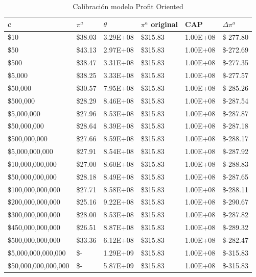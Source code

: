 \begin{table}[H]
    \centering
    \begin{tabular}{|l|l|l|l|l|l|}
    \hline
        c & $\pi^a$ & $\theta$ & $\pi^a$ original &  CAP& $\Delta \pi^a$  \\ \hline
         \$10  &  \$38.03  & 3.29E+08 &  \$315.83  & 1.00E+08 &  \$-277.80   \\ \hline
         \$50  &  \$43.13  & 2.97E+08 &  \$315.83  & 1.00E+08 &  \$-272.69   \\ \hline
         \$500  &  \$38.47  & 3.31E+08 &  \$315.83  & 1.00E+08 &  \$-277.35   \\ \hline
         \$5,000  &  \$38.25  & 3.33E+08 &  \$315.83  & 1.00E+08 &  \$-277.57   \\ \hline
         \$50,000  &  \$30.57  & 7.95E+08 &  \$315.83  & 1.00E+08 &  \$-285.26   \\ \hline
         \$500,000  &  \$28.29  & 8.46E+08 &  \$315.83  & 1.00E+08 &  \$-287.54   \\ \hline
         \$5,000,000  &  \$27.96  & 8.53E+08 &  \$315.83  & 1.00E+08 &  \$-287.87   \\ \hline
         \$50,000,000  &  \$28.64  & 8.39E+08 &  \$315.83  & 1.00E+08 &  \$-287.18   \\ \hline
         \$500,000,000  &  \$27.66  & 8.59E+08 &  \$315.83  & 1.00E+08 &  \$-288.17   \\ \hline
         \$5,000,000,000  &  \$27.91  & 8.54E+08 &  \$315.83  & 1.00E+08 &  \$-287.92   \\ \hline
         \$10,000,000,000  &  \$27.00  & 8.60E+08 &  \$315.83  & 1.00E+08 &  \$-288.83   \\ \hline
         \$50,000,000,000  &  \$28.18  & 8.49E+08 &  \$315.83  & 1.00E+08 &  \$-287.65   \\ \hline
         \$100,000,000,000  &  \$27.71  & 8.58E+08 &  \$315.83  & 1.00E+08 &  \$-288.11   \\ \hline
         \$200,000,000,000  &  \$25.16  & 9.22E+08 &  \$315.83  & 1.00E+08 &  \$-290.67   \\ \hline
         \$300,000,000,000  &  \$28.00  & 8.53E+08 &  \$315.83  & 1.00E+08 &  \$-287.82   \\ \hline
         \$450,000,000,000  &  \$26.51  & 8.87E+08 &  \$315.83  & 1.00E+08 &  \$-289.32   \\ \hline
         \$500,000,000,000  &  \$33.36  & 6.12E+08 &  \$315.83  & 1.00E+08 &  \$-282.47   \\ \hline
         \$5,000,000,000,000  &  \$-  & 1.29E+09 &  \$315.83  & 1.00E+08 &  \$-315.83   \\ \hline
         \$50,000,000,000,000  &  \$-  & 5.87E+09 &  \$315.83  & 1.00E+08 &  \$-315.83   \\ \hline
    \end{tabular}
    \caption{{\footnotesize Calibración modelo Profit Oriented}}
    \label{calibracionPO}
\end{table}

